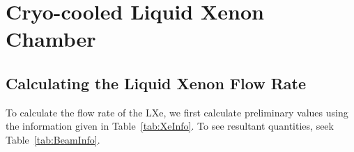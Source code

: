 \documentclass[%
reprint,
nofootinbib,
amsmath, amssymb,
aps,
floatfix,
]{revtex4-2}
\begin{document}


\section{Cryo-cooled Liquid Xenon Chamber}

\subsection{Calculating the Liquid Xenon Flow Rate} \label{sub:Flow}
To calculate the flow rate of the LXe, we first calculate preliminary
values using the information given in Table~\ref{tab:XeInfo}.  To see resultant quantities,
seek Table~\ref{tab:BeamInfo}.
\end{document}
